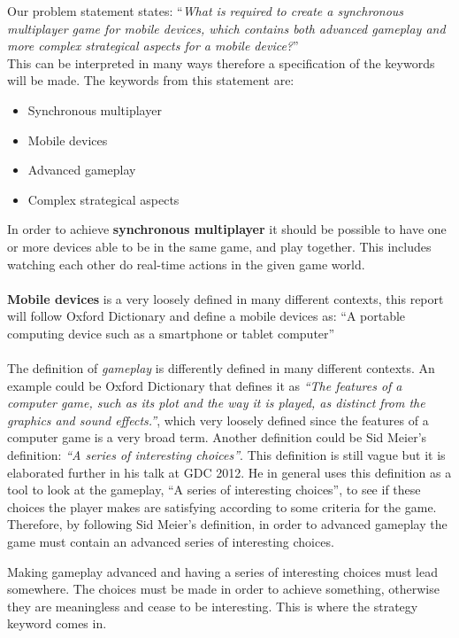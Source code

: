 Our problem statement states: ``\textit{What is required to create a synchronous multiplayer game for mobile devices, which contains both advanced
gameplay and more complex strategical aspects for a mobile device?}''\\
This can be interpreted in many ways therefore a specification of the keywords will be made.
The keywords from this statement are:
\begin{itemize}
\item Synchronous multiplayer
\item Mobile devices
\item Advanced gameplay
\item Complex strategical aspects
\end{itemize}
In order to achieve \textbf{synchronous multiplayer} it should be possible to have one or more devices able to be in the same game, and play together. This includes watching each other do real-time actions in the given game world.\\\\
\textbf{Mobile devices} is a very loosely defined in many different contexts, this report will follow Oxford Dictionary and define a mobile devices as: ``A portable computing device such as a smartphone or tablet computer''\cite{mobileOx}\\\\
The definition of \textit{gameplay} is differently defined in many different contexts. An example could be Oxford Dictionary that defines it as \textit{``The features of a computer game, such as its plot and the way it is played, as distinct from the graphics and sound effects.''}\cite{gameplayOx}, which very loosely defined since the features of a computer game is a very broad term. Another definition could be Sid Meier's definition: \textit{``A series of interesting choices''}\cite{GDC2012}. This definition is still vague but it is elaborated further in his talk at GDC 2012.\cite{GDC2012}
He in general uses this definition as a tool to look at the gameplay, ``A series of interesting choices'', to see if these choices the player makes are satisfying according to some criteria for the game.\\
Therefore, by following Sid Meier's definition, in order to advanced gameplay the game must contain an advanced series of interesting choices.

Making gameplay advanced and having a series of interesting choices must lead somewhere.
The choices must be made in order to achieve something, otherwise they are meaningless and cease to be interesting.
This is where the strategy keyword comes in.\\\\

